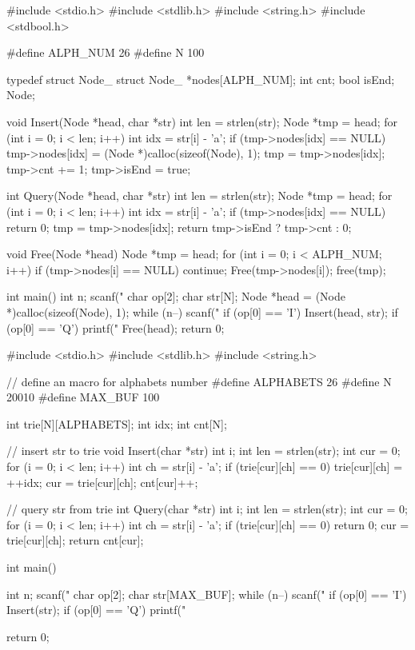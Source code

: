 \begin{mycpptwocol}[链表形式的Trie]
#include <stdio.h>
#include <stdlib.h>
#include <string.h>
#include <stdbool.h>

#define ALPH_NUM 26
#define N 100

typedef struct Node_ {
    struct Node_ *nodes[ALPH_NUM];
    int cnt;
    bool isEnd;
} Node;

void Insert(Node *head, char *str)
{
    int len = strlen(str);
    Node *tmp = head;
    for (int i = 0; i < len; i++) {
        int idx = str[i] - 'a';
        if (tmp->nodes[idx] == NULL) {
            tmp->nodes[idx] = (Node *)calloc(sizeof(Node), 1);
        }
        tmp = tmp->nodes[idx];
    }
    tmp->cnt += 1;
    tmp->isEnd = true;
}

int Query(Node *head, char *str)
{
    int len = strlen(str);
    Node *tmp = head;
    for (int i = 0; i < len; i++) {
        int idx = str[i] - 'a';
        if (tmp->nodes[idx] == NULL) {
            return 0;
        }
        tmp = tmp->nodes[idx];
    }
    return tmp->isEnd ? tmp->cnt : 0;
}

void Free(Node *head) {
    Node *tmp = head;
    for (int i = 0; i < ALPH_NUM; i++) {
        if (tmp->nodes[i] == NULL) {
            continue;
        }
        Free(tmp->nodes[i]);
    }
    free(tmp);
}

int main()
{
    int n;
    scanf("%
    char op[2];
    char str[N];
    Node *head = (Node *)calloc(sizeof(Node), 1);
    while (n--) {
        scanf("%
        if (op[0] == 'I') {
            Insert(head, str);
        }
        if (op[0] == 'Q') {
            printf("%
        }
    }
    Free(head);
    return 0;
}
\end{mycpptwocol}

\begin{mycpptwocol}[数组模拟Trie]
#include <stdio.h>
#include <stdlib.h>
#include <string.h>

// define an macro for alphabets number
#define ALPHABETS 26
#define N 20010
#define MAX_BUF 100

int trie[N][ALPHABETS];
int idx;
int cnt[N];

// insert str to trie
void Insert(char *str) {
    int i;
    int len = strlen(str);
    int cur = 0;
    for (i = 0; i < len; i++) {
        int ch = str[i] - 'a';
        if (trie[cur][ch] == 0) {
            trie[cur][ch] = ++idx;
        }
        cur = trie[cur][ch];
    }
    cnt[cur]++;
}

// query str from trie
int Query(char *str) {
    int i;
    int len = strlen(str);
    int cur = 0;
    for (i = 0; i < len; i++) {
        int ch = str[i] - 'a';
        if (trie[cur][ch] == 0) {
            return 0;
        }
        cur = trie[cur][ch];
    }
    return cnt[cur];
}

int main()
{
    int n;
    scanf("%
    char op[2];
    char str[MAX_BUF];
    while (n--) {
        scanf("%
        if (op[0] == 'I') {
            Insert(str);
        }
        if (op[0] == 'Q') {
            printf("%
        }
    }
    
    return 0;
}
\end{mycpptwocol}

